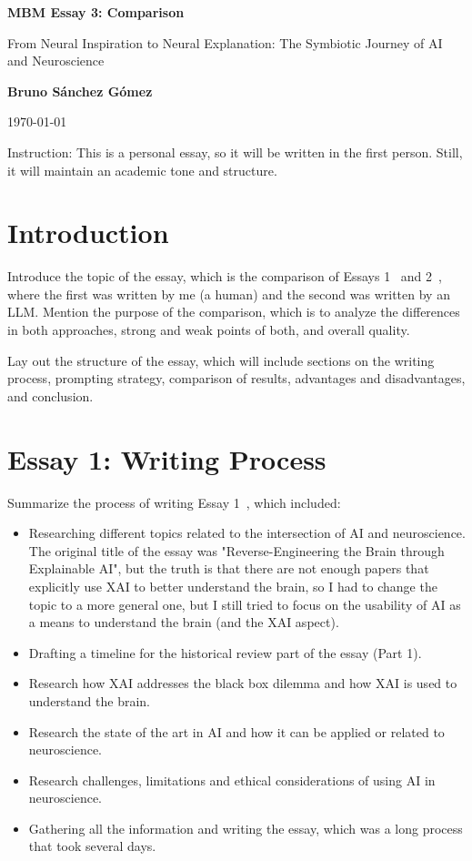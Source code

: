 \documentclass[11pt,a4paper]{article}
\author{Bruno Sánchez Gómez}
\date{\today}
\begin{document}
\begin{titlepage}
    \centering
    \vspace*{2cm}
    {\Huge \bfseries MBM Essay 3: Comparison \par}
    \vspace{2cm}
    {\huge From Neural Inspiration to Neural Explanation: The Symbiotic Journey of AI and Neuroscience \par}
    \vspace{10cm}
    {\large \textbf{Bruno Sánchez Gómez} \par}
    \vfill
    {\large \today \par}
\end{titlepage}

Instruction: This is a personal essay, so it will be written in the first person. Still, it will maintain an academic tone and structure.

\section{Introduction}

Introduce the topic of the essay, which is the comparison of Essays 1~\cite{essay1} and 2~\cite{essay2}, where the first was written by me (a human) and the second was written by an LLM. Mention the purpose of the comparison, which is to analyze the differences in both approaches, strong and weak points of both, and overall quality.

Lay out the structure of the essay, which will include sections on the writing process, prompting strategy, comparison of results, advantages and disadvantages, and conclusion.

\section{Essay 1: Writing Process}

Summarize the process of writing Essay 1~\cite{essay1}, which included:
\begin{itemize}
    \item Researching different topics related to the intersection of AI and neuroscience. The original title of the essay was "Reverse-Engineering the Brain through Explainable AI", but the truth is that there are not enough papers that explicitly use XAI to better understand the brain, so I had to change the topic to a more general one, but I still tried to focus on the usability of AI as a means to understand the brain (and the XAI aspect).
    \item Drafting a timeline for the historical review part of the essay (Part 1).
    \item Research how XAI addresses the black box dilemma and how XAI is used to understand the brain.
    \item Research the state of the art in AI and how it can be applied or related to neuroscience.
    \item Research challenges, limitations and ethical considerations of using AI in neuroscience.
    \item Gathering all the information and writing the essay, which was a long process that took several days.
\end{itemize}
\end{document}

